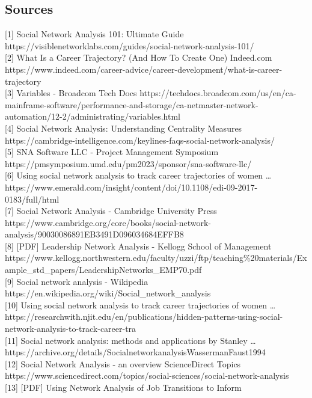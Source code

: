 \documentclass[
  letterpaper,
  DIV=11,
  numbers=noendperiod]{scrartcl}
\begin{document}
\subsection{Sources}\label{sources}

{[}1{]} Social Network Analysis 101: Ultimate Guide
https://visiblenetworklabs.com/guides/social-network-analysis-101/\\
{[}2{]} What Is a Career Trajectory? (And How To Create One) \textbar{}
Indeed.com
https://www.indeed.com/career-advice/career-development/what-is-career-trajectory\\
{[}3{]} Variables - Broadcom Tech Docs
https://techdocs.broadcom.com/us/en/ca-mainframe-software/performance-and-storage/ca-netmaster-network-automation/12-2/administrating/variables.html\\
{[}4{]} Social Network Analysis: Understanding Centrality Measures
https://cambridge-intelligence.com/keylines-faqs-social-network-analysis/\\
{[}5{]} SNA Software LLC - Project Management Symposium
https://pmsymposium.umd.edu/pm2023/sponsor/sna-software-llc/\\
{[}6{]} Using social network analysis to track career trajectories of
women \ldots{}
https://www.emerald.com/insight/content/doi/10.1108/edi-09-2017-0183/full/html\\
{[}7{]} Social Network Analysis - Cambridge University Press
https://www.cambridge.org/core/books/social-network-analysis/90030086891EB3491D096034684EFFB8\\
{[}8{]} {[}PDF{]} Leadership Network Analysis - Kellogg School of
Management
https://www.kellogg.northwestern.edu/faculty/uzzi/ftp/teaching\%20materials/Example\_std\_papers/LeadershipNetworks\_EMP70.pdf\\
{[}9{]} Social network analysis - Wikipedia
https://en.wikipedia.org/wiki/Social\_network\_analysis\\
{[}10{]} Using social network analysis to track career trajectories of
women \ldots{}
https://researchwith.njit.edu/en/publications/hidden-patterns-using-social-network-analysis-to-track-career-tra\\
{[}11{]} Social network analysis: methods and applications by Stanley
\ldots{}
https://archive.org/details/SocialnetworkanalysisWassermanFaust1994\\
{[}12{]} Social Network Analysis - an overview \textbar{} ScienceDirect
Topics
https://www.sciencedirect.com/topics/social-sciences/social-network-analysis\\
{[}13{]} {[}PDF{]} Using Network Analysis of Job Transitions to Inform
\end{document}
